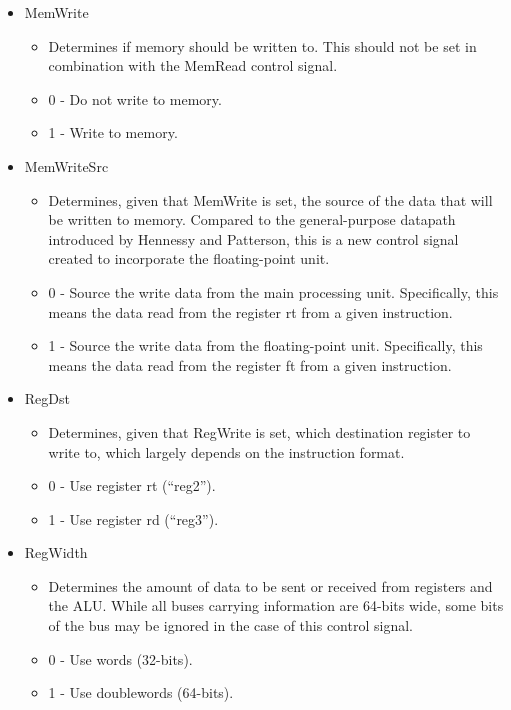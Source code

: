 \documentclass[
    paper=letter,
    parskip=half,
    fontsize=12pt,
    titlepage=firstiscover,
    toc=bibliography,
    numbers=endperiod
]{scrartcl}
\providecommand{\tightlist}{%
  \setlength{\itemsep}{0pt}\setlength{\parskip}{0pt}}
\begin{document}
\begin{itemize}
    \item MemWrite
    \begin{itemize}
        \tightlist
        \item Determines if memory should be written to. This should not be set in combination with the MemRead control signal.
        \item 0 - Do not write to memory.
        \item 1 - Write to memory.
    \end{itemize}

    \item MemWriteSrc
    \begin{itemize}
        \tightlist
        \item Determines, given that MemWrite is set, the source of the data that
            will be written to memory. Compared to the general-purpose datapath
            introduced by Hennessy and Patterson, this is a new control signal
            created to incorporate the floating-point unit.
        \item 0 - Source the write data from the main processing unit.
            Specifically, this means the data read from the register rt from a
            given instruction.
        \item 1 - Source the write data from the floating-point unit.
            Specifically, this means the data read from the register ft from a
            given instruction.
    \end{itemize}

    \item RegDst
    \begin{itemize}
        \tightlist
        \item Determines, given that RegWrite is set, which destination register
            to write to, which largely depends on the instruction format.
        \item 0 - Use register rt (``reg2'').
        \item 1 - Use register rd (``reg3'').
    \end{itemize}

    \item RegWidth
    \begin{itemize}
        \tightlist
        \item Determines the amount of data to be sent or received from registers
            and the ALU. While all buses carrying information are 64-bits wide,
            some bits of the bus may be ignored in the case of this control
            signal.
        \item 0 - Use words (32-bits).
        \item 1 - Use doublewords (64-bits).
    \end{itemize}


\end{itemize}
\end{document}
